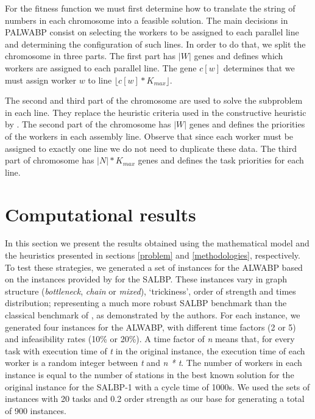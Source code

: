 \documentclass{singlecol-new}
\begin{document}
For the fitness function we must first determine how to translate the string of numbers in each chromosome into a feasible solution. The main decisions in PALWABP consist on selecting the workers to be assigned to each parallel line and determining the configuration of such lines. In order to do that, we split the chromosome in three parts. The first part has $|W|$ genes and defines which workers are assigned to each parallel line. The gene $c[w]$ determines that we must assign worker $w$ to line $\lfloor c[w] * K_{max} \rfloor$.

The second and third part of the chromosome are used to solve the subproblem in each line. They replace the heuristic criteria used in the constructive heuristic by \cite{moreira12simple}. The second part of the chromosome has $|W|$ genes and defines the priorities of the workers in each assembly line. Observe that since each worker must be assigned to exactly one line we do not need to duplicate these data. The third part of chromosome has $|N| * K_{max}$ genes and defines the task priorities for each line.

\section{Computational results}\label{computational}

In this section we present the results obtained using the mathematical model and the heuristics presented in sections \ref{problem} and \ref{methodologies}, respectively. To test these strategies, we generated a set of instances for the ALWABP based on the instances provided by \cite{otto13systematic} for the SALBP. These instances vary in graph structure (\textit{bottleneck}, \textit{chain} or \textit{mixed}), `trickiness', order of strength and times distribution; representing a much more robust SALBP benchmark than the classical benchmark of \cite{hoffmann90assembly}, as demonstrated by the authors. For each instance, we generated four instances for the ALWABP, with different time factors (2 or 5) and infeasibility rates (10\% or 20\%). A time factor of \textit{n} means that, for every task with execution time of \textit{t} in the original instance, the execution time of each worker is a random integer between \textit{t} and \textit{n * t}. The number of workers in each instance is equal to the number of stations in the best known solution for the original instance for the SALBP-1 with a cycle time of 1000s. We used the sets of instances with 20 tasks and 0.2 order strength as our base for generating a total of 900 instances.
\end{document}
